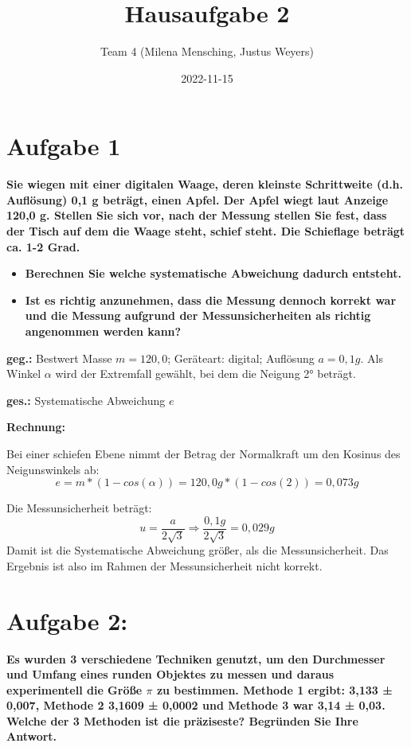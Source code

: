 \documentclass[
]{article}
\title{Hausaufgabe 2}
\author{Team 4 (Milena Mensching, Justus Weyers)}
\date{2022-11-15}
\providecommand{\tightlist}{%
  \setlength{\itemsep}{0pt}\setlength{\parskip}{0pt}}
\begin{document}
\maketitle

\hypertarget{aufgabe-1}{%
\section{Aufgabe 1}\label{aufgabe-1}}

\textbf{Sie wiegen mit einer digitalen Waage, deren kleinste
Schrittweite (d.h. Auflösung) 0,1 g beträgt, einen Apfel. Der Apfel
wiegt laut Anzeige 120,0 g. Stellen Sie sich vor, nach der Messung
stellen Sie fest, dass der Tisch auf dem die Waage steht, schief steht.
Die Schieflage beträgt ca. 1-2 Grad.}

\begin{itemize}
\tightlist
\item
  \textbf{Berechnen Sie welche systematische Abweichung dadurch
  entsteht.}
\item
  \textbf{Ist es richtig anzunehmen, dass die Messung dennoch korrekt
  war und die Messung aufgrund der Messunsicherheiten als richtig
  angenommen werden kann?}
\end{itemize}

\textbf{geg.:} Bestwert Masse \(m = 120,0\); Geräteart: digital;
Auflösung \(a=0,1g\). Als Winkel \(\alpha\) wird der Extremfall gewählt,
bei dem die Neigung 2° beträgt.

\textbf{ges.:} Systematische Abweichung \(e\)

\textbf{Rechnung:}

Bei einer schiefen Ebene nimmt der Betrag der Normalkraft um den Kosinus
des Neigunswinkels ab:
\[e = m*(1-cos(\alpha)) = 120,0g*(1-cos(2)) = 0,073g\]

Die Messunsicherheit beträgt:
\[ u = \frac{a}{2\sqrt{3}} \Rightarrow \frac{0,1g}{2\sqrt{3}} = 0,029g\]
Damit ist die Systematische Abweichung größer, als die Messunsicherheit.
Das Ergebnis ist also im Rahmen der Messunsicherheit nicht korrekt.

\hypertarget{aufgabe-2}{%
\section{Aufgabe 2:}\label{aufgabe-2}}

\textbf{Es wurden 3 verschiedene Techniken genutzt, um den Durchmesser
und Umfang eines runden Objektes zu messen und daraus experimentell die
Größe \(\pi\) zu bestimmen. Methode 1 ergibt: 3,133 ± 0,007, Methode 2
3,1609 ± 0,0002 und Methode 3 war 3,14 ± 0,03. Welche der 3 Methoden ist
die präziseste? Begründen Sie Ihre Antwort.}
\end{document}
